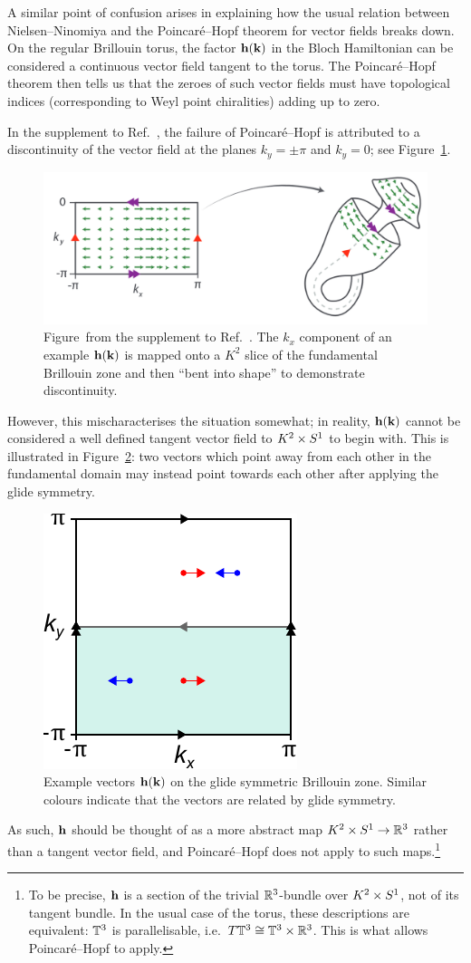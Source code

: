 A similar point of confusion arises in explaining how the usual relation between Nielsen--Ninomiya and the Poincaré--Hopf theorem for vector fields breaks down. On the regular Brillouin torus, the factor $\vb{h}(\vb{k})$ in the Bloch Hamiltonian can be considered a continuous vector field tangent to the torus. The Poincaré--Hopf theorem then tells us that the zeroes of such vector fields must have topological indices (corresponding to Weyl point chiralities) adding up to zero.

In the supplement to Ref.~\cite{Fonseca-Vaidya_nonorientable}, the failure of Poincaré--Hopf is attributed to a discontinuity of the vector field at the planes $k_y=\pm\pi$ and $k_y=0$; see Figure~\ref{fig:Klein-discontinuity}.
\begin{figure}[htb!]
	\centering
	\includegraphics[width=.8\linewidth]{Images/Klein-discontinuity}
	\caption{Figure~from the supplement to Ref.~\cite{Fonseca-Vaidya_nonorientable}. The $k_x$ component of an example $\vb{h}(\vb{k})$ is mapped onto a $K^2$ slice of the fundamental Brillouin zone and then ``bent into shape'' to demonstrate discontinuity.
	}
	\label{fig:Klein-discontinuity}
\end{figure}
However, this mischaracterises the situation somewhat; in reality, $\vb{h}(\vb{k})$ cannot be considered a well defined tangent vector field to $K^2\times S^1$ to begin with. This is illustrated in Figure~\ref{fig:BZ_vectors}: two vectors which point away from each other in the fundamental domain may instead point towards each other after applying the glide symmetry.
\begin{figure}[htb!]
	\centering
	\includegraphics[width=.3\linewidth]{Images/BZ_vectors}
	\caption{Example vectors $\vb{h}(\vb{k})$ on the glide symmetric Brillouin zone. Similar colours indicate that the vectors are related by glide symmetry.} %
	\label{fig:BZ_vectors}
\end{figure}
As such, $\vb{h}$ should be thought of as a more abstract map $K^2\times S^1\to\mathbb{R}^3$ rather than a tangent vector field, and Poincaré--Hopf does not apply to such maps.\footnote{
	To be precise, $\vb{h}$ is a section of the trivial $\mathbb{R}^3$-bundle over $K^2\times S^1$, not of its tangent bundle. In the usual case of the torus, these descriptions are equivalent: $\mathbb{T}^3$ is parallelisable, i.e.\ $T\mathbb{T}^3\cong \mathbb{T}^3\times\mathbb{R}^3$. This is what allows Poincaré--Hopf to apply.}

